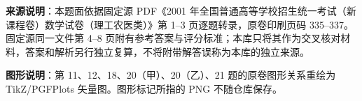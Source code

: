 


\begin{gktip}
\textbf{来源说明}：本题面依据固定源 PDF《2001 年全国普通高等学校招生统一考试（新课程卷）数学试卷（理工农医类）》第 1–3 页逐题转录，原卷印刷页码 335–337。固定源同一文件第 4–8 页附有参考答案与评分标准；本库只将其作为交叉核对材料，答案和解析另行独立复算，不将附带解答误称为本库的独立来源。

\textbf{图形说明}：第 11、12、18、20（甲）、20（乙）、21 题的原卷图形关系重绘为 TikZ/PGFPlots 矢量图。图形标记所指的 PNG 不随仓库保存。
\end{gktip}


